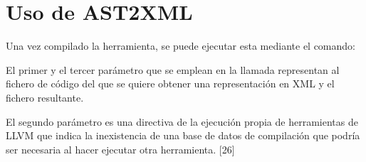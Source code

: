 \section{Uso de AST2XML}

Una vez compilado la herramienta, se puede ejecutar esta mediante el comando:



El primer y el tercer par\'ametro que se emplean en la llamada representan al fichero de c\'odigo del que se quiere obtener una representaci\'on en XML y el fichero resultante.

El segundo par\'ametro es una directiva de la ejecuci\'on propia de herramientas de LLVM que indica la inexistencia de una base de datos de compilaci\'on que podr\'ia ser necesaria al hacer ejecutar otra herramienta. [26]











